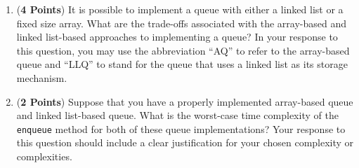 \documentclass[12pt]{article}
\begin{document}
\begin{enumerate}
  \begin{enumerate}





  \item ({\bf 4 Points}) It is possible to implement a queue with
    either a linked list or a fixed size array.  What are the
    trade-offs associated with the array-based and linked list-based
    approaches to implementing a queue?  In your response to this
    question, you may use the abbreviation ``AQ'' to refer to the
    array-based queue and ``LLQ'' to stand for the queue that uses a
    linked list as its storage mechanism.

  \item ({\bf 2 Points}) Suppose that you have a properly implemented
    array-based queue and linked list-based queue.  What is the
    worst-case time complexity of the {\tt enqueue} method for both of
    these queue implementations?  Your response to this question
    should include a clear justification for your chosen complexity or
    complexities.


\end{enumerate}
\end{enumerate}
\end{document}
